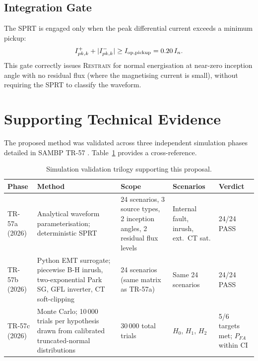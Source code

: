 \documentclass[11pt, a4paper]{article}
\begin{document}
\subsection{Integration Gate}

The SPRT is engaged only when the peak differential current exceeds a minimum
pickup:
\begin{equation}
  I^+_{pk,k} + |I^-_{pk,k}| \geq I_{\rm op,pickup} = 0.20\,I_n.
  \label{eq:gate}
\end{equation}
This gate correctly issues \textsc{Restrain} for normal energisation at
near-zero inception angle with no residual flux (where the magnetising
current is small), without requiring the SPRT to classify the waveform.

\section{Supporting Technical Evidence}

The proposed method was validated across three independent simulation phases
detailed in SAMBP TR-57 \cite{SAMBP_TR21}.  Table~\ref{tab:evidence_summary}
provides a cross-reference.

\begin{table}[htbp]
  \centering
  \caption{Simulation validation trilogy supporting this proposal.}
  \label{tab:evidence_summary}
  \begin{tabular}{p{2.2cm}p{3.5cm}p{3.0cm}p{2.5cm}p{2.5cm}}
    \toprule
    \textbf{Phase} & \textbf{Method} & \textbf{Scope}
      & \textbf{Scenarios} & \textbf{Verdict} \\
    \midrule
    TR-57a (2026) & Analytical waveform parameterisation; deterministic SPRT
      & 24 scenarios, 3 source types, 2 inception angles, 2 residual flux levels
      & Internal fault, inrush, ext.\ CT sat.
      & 24/24 PASS \\[4pt]
    TR-57b (2026) & Python EMT surrogate; piecewise B-H inrush, two-exponential
      Park SG, GFL inverter, CT soft-clipping
      & 24 scenarios (same matrix as TR-57a)
      & Same 24 scenarios
      & 24/24 PASS \\[4pt]
    TR-57c (2026) & Monte Carlo; 10\,000 trials per hypothesis drawn from
      calibrated truncated-normal distributions
      & 30\,000 total trials
      & $H_0$, $H_1$, $H_2$
      & 5/6 targets met; $P_{FA}$ within CI \\
    \bottomrule
  \end{tabular}
\end{table}
\end{document}
